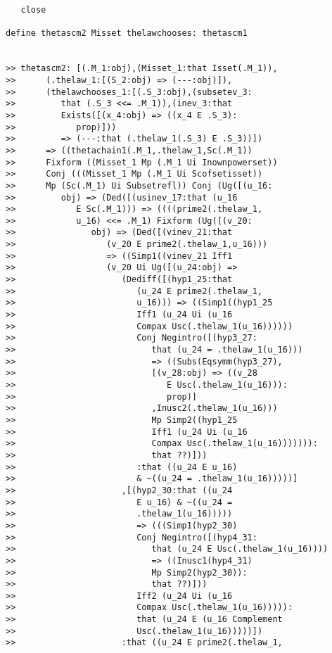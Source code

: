 \documentclass[12pt]{article}
\begin{document}
\begin{verbatim}
   close

define thetascm2 Misset thelawchooses: thetascm1


>> thetascm2: [(.M_1:obj),(Misset_1:that Isset(.M_1)),
>>      (.thelaw_1:[(S_2:obj) => (---:obj)]),
>>      (thelawchooses_1:[(.S_3:obj),(subsetev_3:
>>         that (.S_3 <<= .M_1)),(inev_3:that
>>         Exists([(x_4:obj) => ((x_4 E .S_3):
>>            prop)]))
>>         => (---:that (.thelaw_1(.S_3) E .S_3))])
>>      => ((thetachain1(.M_1,.thelaw_1,Sc(.M_1))
>>      Fixform ((Misset_1 Mp (.M_1 Ui Inownpowerset))
>>      Conj (((Misset_1 Mp (.M_1 Ui Scofsetisset))
>>      Mp (Sc(.M_1) Ui Subsetrefl)) Conj (Ug([(u_16:
>>         obj) => (Ded([(usinev_17:that (u_16
>>            E Sc(.M_1))) => ((((prime2(.thelaw_1,
>>            u_16) <<= .M_1) Fixform (Ug([(v_20:
>>               obj) => (Ded([(vinev_21:that
>>                  (v_20 E prime2(.thelaw_1,u_16)))
>>                  => ((Simp1((vinev_21 Iff1
>>                  (v_20 Ui Ug([(u_24:obj) =>
>>                     (Dediff([(hyp1_25:that
>>                        (u_24 E prime2(.thelaw_1,
>>                        u_16))) => ((Simp1((hyp1_25
>>                        Iff1 (u_24 Ui (u_16
>>                        Compax Usc(.thelaw_1(u_16))))))
>>                        Conj Negintro([(hyp3_27:
>>                           that (u_24 = .thelaw_1(u_16)))
>>                           => ((Subs(Eqsymm(hyp3_27),
>>                           [(v_28:obj) => ((v_28
>>                              E Usc(.thelaw_1(u_16))):
>>                              prop)]
>>                           ,Inusc2(.thelaw_1(u_16)))
>>                           Mp Simp2((hyp1_25
>>                           Iff1 (u_24 Ui (u_16
>>                           Compax Usc(.thelaw_1(u_16))))))):
>>                           that ??)]))
>>                        :that ((u_24 E u_16)
>>                        & ~((u_24 = .thelaw_1(u_16)))))]
>>                     ,[(hyp2_30:that ((u_24
>>                        E u_16) & ~((u_24 =
>>                        .thelaw_1(u_16)))))
>>                        => (((Simp1(hyp2_30)
>>                        Conj Negintro([(hyp4_31:
>>                           that (u_24 E Usc(.thelaw_1(u_16))))
>>                           => ((Inusc1(hyp4_31)
>>                           Mp Simp2(hyp2_30)):
>>                           that ??)]))
>>                        Iff2 (u_24 Ui (u_16
>>                        Compax Usc(.thelaw_1(u_16))))):
>>                        that (u_24 E (u_16 Complement
>>                        Usc(.thelaw_1(u_16)))))])
>>                     :that ((u_24 E prime2(.thelaw_1,

\end{verbatim}
\end{document}
